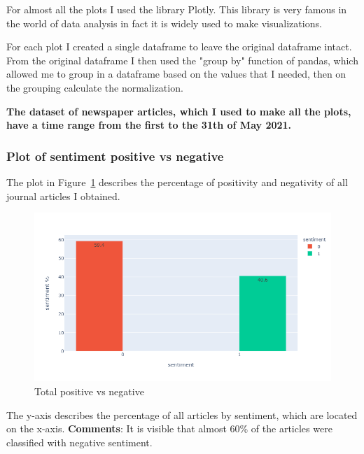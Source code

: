 For almost all the plots I used the library Plotly. This library is very famous in the world of data analysis in fact it is widely used to make visualizations. 

For each plot I created a single dataframe to leave the original dataframe intact. From the original dataframe I then used the "group by" function of pandas, which allowed me to group in a dataframe based on the values that I needed, then on the grouping calculate the normalization.

\textbf{The dataset of newspaper articles, which I used to make all the plots, have a time range from the first to the 31th of May 2021.}

\subsubsection{Plot of sentiment positive vs negative} 
The plot in Figure~\ref{fig:fig_tot} describes the percentage of positivity and negativity of all journal articles I obtained.
\begin{figure}[H]
\centering
\includegraphics[width=1\textwidth]{images/output_68_0.png}
\caption{Total positive vs negative}
\label{fig:fig_tot}
\end{figure}
\FloatBarrier

The y-axis describes the percentage of all articles by sentiment, which are located on the x-axis.
\textbf{Comments}:
It is visible that almost 60\% of the articles were classified with negative sentiment.

